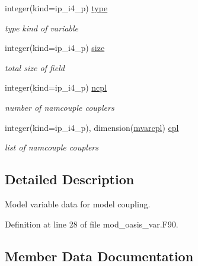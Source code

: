 \begin{DoxyCompactItemize}
integer(kind=ip\+\_\+i4\+\_\+p) \hyperlink{structmod__oasis__var_1_1prism__var__type_a944549d5fb1aebecc59ca5dbff9b3222}{type}
\begin{DoxyCompactList}\small\item\em type kind of variable \end{DoxyCompactList}\item 
integer(kind=ip\+\_\+i4\+\_\+p) \hyperlink{structmod__oasis__var_1_1prism__var__type_a13dac48e592591a9e06999aadaf1e6b7}{size}
\begin{DoxyCompactList}\small\item\em total size of field \end{DoxyCompactList}\item 
integer(kind=ip\+\_\+i4\+\_\+p) \hyperlink{structmod__oasis__var_1_1prism__var__type_a5e74e0f54df6c10c13569250bd616c94}{ncpl}
\begin{DoxyCompactList}\small\item\em number of namcouple couplers \end{DoxyCompactList}\item 
integer(kind=ip\+\_\+i4\+\_\+p), dimension(\hyperlink{namespacemod__oasis__var_a687d6dce16699f36ae3a67accfdba3a9}{mvarcpl}) \hyperlink{structmod__oasis__var_1_1prism__var__type_aca0fbd288bee74de5e08e77ad869039b}{cpl}
\begin{DoxyCompactList}\small\item\em list of namcouple couplers \end{DoxyCompactList}\end{DoxyCompactItemize}


\subsection{Detailed Description}
Model variable data for model coupling. 

Definition at line 28 of file mod\+\_\+oasis\+\_\+var.\+F90.



\subsection{Member Data Documentation}
\mbox{\label{structmod__oasis__var_1_1prism__var__type_aca0fbd288bee74de5e08e77ad869039b}} 
